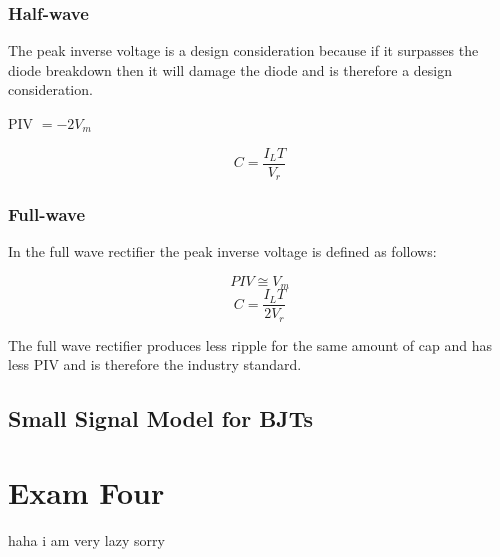 \documentclass{article}
\begin{document}
\subsubsection*{Half-wave}
\begin{center}
    The peak inverse voltage is a design consideration because if it surpasses the diode breakdown then it will damage the diode and is therefore a design consideration.
    \vspace{3mm}
    
    PIV $= -2V_m$
\end{center}
\begin{equation}
    C = \frac{I_L T}{V_r}
\end{equation}
\subsubsection*{Full-wave}
\begin{center}
    In the full wave rectifier the peak inverse voltage is defined as follows:
\end{center}
\begin{equation}
    PIV \cong V_m
\end{equation}
\begin{equation}
    C = \frac{I_L T}{2 V_r}
\end{equation}
\begin{center}
    The full wave rectifier produces less ripple for the same amount of cap and has less PIV and is therefore the industry standard.
\end{center}
\vspace{8mm}
\subsection*{Small Signal Model for BJTs}
\newpage
\section*{Exam Four}
\begin{center}
    haha i am very lazy sorry
\end{center}
\end{document}
